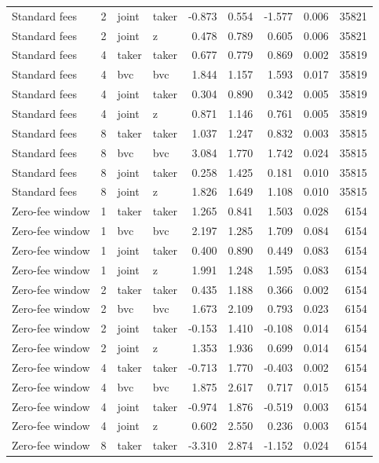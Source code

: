 \begin{tabular}{lrllrrrrr}
Standard fees & 2 & joint & taker & -0.873 & 0.554 & -1.577 & 0.006 & 35821 \\
Standard fees & 2 & joint & z & 0.478 & 0.789 & 0.605 & 0.006 & 35821 \\
Standard fees & 4 & taker & taker & 0.677 & 0.779 & 0.869 & 0.002 & 35819 \\
Standard fees & 4 & bvc & bvc & 1.844 & 1.157 & 1.593 & 0.017 & 35819 \\
Standard fees & 4 & joint & taker & 0.304 & 0.890 & 0.342 & 0.005 & 35819 \\
Standard fees & 4 & joint & z & 0.871 & 1.146 & 0.761 & 0.005 & 35819 \\
Standard fees & 8 & taker & taker & 1.037 & 1.247 & 0.832 & 0.003 & 35815 \\
Standard fees & 8 & bvc & bvc & 3.084 & 1.770 & 1.742 & 0.024 & 35815 \\
Standard fees & 8 & joint & taker & 0.258 & 1.425 & 0.181 & 0.010 & 35815 \\
Standard fees & 8 & joint & z & 1.826 & 1.649 & 1.108 & 0.010 & 35815 \\
Zero-fee window & 1 & taker & taker & 1.265 & 0.841 & 1.503 & 0.028 & 6154 \\
Zero-fee window & 1 & bvc & bvc & 2.197 & 1.285 & 1.709 & 0.084 & 6154 \\
Zero-fee window & 1 & joint & taker & 0.400 & 0.890 & 0.449 & 0.083 & 6154 \\
Zero-fee window & 1 & joint & z & 1.991 & 1.248 & 1.595 & 0.083 & 6154 \\
Zero-fee window & 2 & taker & taker & 0.435 & 1.188 & 0.366 & 0.002 & 6154 \\
Zero-fee window & 2 & bvc & bvc & 1.673 & 2.109 & 0.793 & 0.023 & 6154 \\
Zero-fee window & 2 & joint & taker & -0.153 & 1.410 & -0.108 & 0.014 & 6154 \\
Zero-fee window & 2 & joint & z & 1.353 & 1.936 & 0.699 & 0.014 & 6154 \\
Zero-fee window & 4 & taker & taker & -0.713 & 1.770 & -0.403 & 0.002 & 6154 \\
Zero-fee window & 4 & bvc & bvc & 1.875 & 2.617 & 0.717 & 0.015 & 6154 \\
Zero-fee window & 4 & joint & taker & -0.974 & 1.876 & -0.519 & 0.003 & 6154 \\
Zero-fee window & 4 & joint & z & 0.602 & 2.550 & 0.236 & 0.003 & 6154 \\
Zero-fee window & 8 & taker & taker & -3.310 & 2.874 & -1.152 & 0.024 & 6154 \\

\end{tabular}
